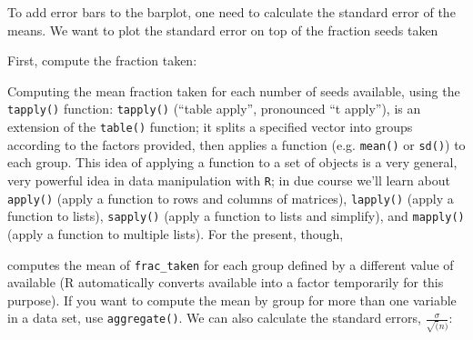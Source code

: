 \documentclass[11pt,]{article}
\newenvironment{Shaded}{\begin{snugshade}}{\end{snugshade}}
\newcommand{\KeywordTok}[1]{\textcolor[rgb]{0.13,0.29,0.53}{\textbf{#1}}}
\newcommand{\StringTok}[1]{\textcolor[rgb]{0.31,0.60,0.02}{#1}}
\newcommand{\OperatorTok}[1]{\textcolor[rgb]{0.81,0.36,0.00}{\textbf{#1}}}
\newcommand{\NormalTok}[1]{#1}
\begin{document}
To add error bars to the barplot, one need to calculate the standard
error of the means. We want to plot the standard error on top of the
fraction seeds taken

First, compute the fraction taken:

\begin{Shaded}
\end{Shaded}

Computing the mean fraction taken for each number of seeds available,
using the \texttt{tapply()} function: \texttt{tapply()} (``table
apply'', pronounced ``t apply''), is an extension of the
\texttt{table()} function; it splits a specified vector into groups
according to the factors provided, then applies a function (e.g.
\texttt{mean()} or \texttt{sd()}) to each group. This idea of applying a
function to a set of objects is a very general, very powerful idea in
data manipulation with \texttt{R}; in due course we'll learn about
\texttt{apply()} (apply a function to rows and columns of matrices),
\texttt{lapply()} (apply a function to lists), \texttt{sapply()} (apply
a function to lists and simplify), and \texttt{mapply()} (apply a
function to multiple lists). For the present, though,

\begin{Shaded}
\end{Shaded}

computes the mean of \texttt{frac\_taken} for each group defined by a
different value of available (R automatically converts available into a
factor temporarily for this purpose). If you want to compute the mean by
group for more than one variable in a data set, use
\texttt{aggregate()}. We can also calculate the standard errors,
\(\frac{\sigma}{\sqrt(n)}\):

\begin{Shaded}
\end{Shaded}
\end{document}
